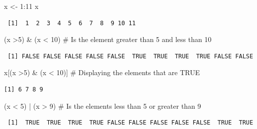 \documentclass[
  letterpaper,
  DIV=11,
  numbers=noendperiod]{scrreprt}
\newenvironment{Shaded}{\begin{snugshade}}{\end{snugshade}}
\newcommand{\CommentTok}[1]{\textcolor[rgb]{0.37,0.37,0.37}{#1}}
\newcommand{\DecValTok}[1]{\textcolor[rgb]{0.68,0.00,0.00}{#1}}
\newcommand{\NormalTok}[1]{\textcolor[rgb]{0.00,0.23,0.31}{#1}}
\newcommand{\OtherTok}[1]{\textcolor[rgb]{0.00,0.23,0.31}{#1}}
\newcommand{\SpecialCharTok}[1]{\textcolor[rgb]{0.37,0.37,0.37}{#1}}
\begin{document}
\begin{Shaded}
\begin{Highlighting}[]
\NormalTok{x }\OtherTok{\textless{}{-}} \DecValTok{1}\SpecialCharTok{:}\DecValTok{11}
\NormalTok{x}
\end{Highlighting}
\end{Shaded}

\begin{verbatim}
 [1]  1  2  3  4  5  6  7  8  9 10 11
\end{verbatim}

\begin{Shaded}
\begin{Highlighting}[]
\NormalTok{(x }\SpecialCharTok{\textgreater{}}\DecValTok{5}\NormalTok{) }\SpecialCharTok{\&}\NormalTok{ (x }\SpecialCharTok{\textless{}} \DecValTok{10}\NormalTok{) }\CommentTok{\# Is the element greater than 5 and less than 10}
\end{Highlighting}
\end{Shaded}

\begin{verbatim}
 [1] FALSE FALSE FALSE FALSE FALSE  TRUE  TRUE  TRUE  TRUE FALSE FALSE
\end{verbatim}

\begin{Shaded}
\begin{Highlighting}[]
\NormalTok{x[(x }\SpecialCharTok{\textgreater{}}\DecValTok{5}\NormalTok{) }\SpecialCharTok{\&}\NormalTok{ (x }\SpecialCharTok{\textless{}} \DecValTok{10}\NormalTok{)] }\CommentTok{\# Displaying the elements that are TRUE}
\end{Highlighting}
\end{Shaded}

\begin{verbatim}
[1] 6 7 8 9
\end{verbatim}

\begin{Shaded}
\begin{Highlighting}[]
\NormalTok{(x }\SpecialCharTok{\textless{}} \DecValTok{5}\NormalTok{) }\SpecialCharTok{|}\NormalTok{ (x }\SpecialCharTok{\textgreater{}} \DecValTok{9}\NormalTok{) }\CommentTok{\# Is the elements less than 5 or greater than 9}
\end{Highlighting}
\end{Shaded}

\begin{verbatim}
 [1]  TRUE  TRUE  TRUE  TRUE FALSE FALSE FALSE FALSE FALSE  TRUE  TRUE
\end{verbatim}
\end{document}
